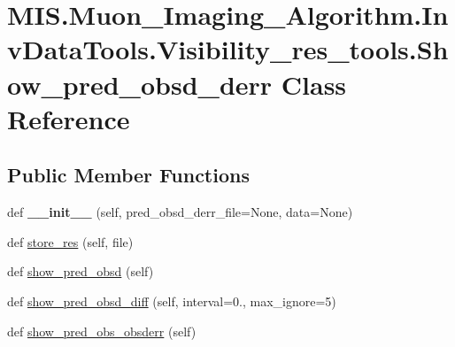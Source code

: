 \hypertarget{classMIS_1_1Muon__Imaging__Algorithm_1_1InvDataTools_1_1Visibility__res__tools_1_1Show__pred__obsd__derr}{}\section{M\+I\+S.\+Muon\+\_\+\+Imaging\+\_\+\+Algorithm.\+Inv\+Data\+Tools.\+Visibility\+\_\+res\+\_\+tools.\+Show\+\_\+pred\+\_\+obsd\+\_\+derr Class Reference}
\label{classMIS_1_1Muon__Imaging__Algorithm_1_1InvDataTools_1_1Visibility__res__tools_1_1Show__pred__obsd__derr}
\subsection*{Public Member Functions}
\begin{DoxyCompactItemize}
\item 
\mbox{\label{classMIS_1_1Muon__Imaging__Algorithm_1_1InvDataTools_1_1Visibility__res__tools_1_1Show__pred__obsd__derr_a8ad33869f5baac7a9e87dce88ea075cc}} 
def {\bfseries \+\_\+\+\_\+init\+\_\+\+\_\+} (self, pred\+\_\+obsd\+\_\+derr\+\_\+file=None, data=None)
\item 
def \hyperlink{classMIS_1_1Muon__Imaging__Algorithm_1_1InvDataTools_1_1Visibility__res__tools_1_1Show__pred__obsd__derr_a7848841f4078ca685da70e66f90b2f6d}{store\+\_\+res} (self, file)
\item 
def \hyperlink{classMIS_1_1Muon__Imaging__Algorithm_1_1InvDataTools_1_1Visibility__res__tools_1_1Show__pred__obsd__derr_ac8e283587ac50728766222fb3782e1a1}{show\+\_\+pred\+\_\+obsd} (self)
\item 
def \hyperlink{classMIS_1_1Muon__Imaging__Algorithm_1_1InvDataTools_1_1Visibility__res__tools_1_1Show__pred__obsd__derr_a620d4810c874d9bd2ab56632c8dab460}{show\+\_\+pred\+\_\+obsd\+\_\+diff} (self, interval=0., max\+\_\+ignore=5)
\item 
def \hyperlink{classMIS_1_1Muon__Imaging__Algorithm_1_1InvDataTools_1_1Visibility__res__tools_1_1Show__pred__obsd__derr_a73775c1b9481d06408b9024fdbe2d507}{show\+\_\+pred\+\_\+obs\+\_\+obsderr} (self)
\end{DoxyCompactItemize}
